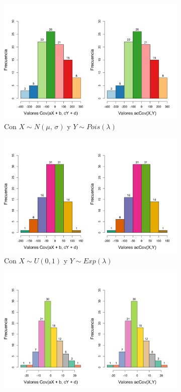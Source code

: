 \documentclass{article}
\begin{document}
\begin{figure}[h]
    \begin{center}
    \captionsetup{justification=centering}
    \begin{subfigure}[b]{0.5\textwidth}
        \includegraphics[scale=0.35]{Figures/norm-pois.png}
        \caption{Con $X \sim N(\mu, \, \sigma)$ y $Y \sim Pois(\lambda)$}
    \end{subfigure}
    \begin{subfigure}[b]{0.5\textwidth}
        \includegraphics[scale=0.35]{Figures/unif-exp.png}
        \caption{Con $X \sim U(0,1)$ y $Y\sim Exp(\lambda)$}
    \end{subfigure}
        \begin{subfigure}[b]{0.5\textwidth}
        \includegraphics[scale=0.35]{Figures/exp-pois.png}

\end{subfigure}
\end{center}
\end{figure}
\end{document}
